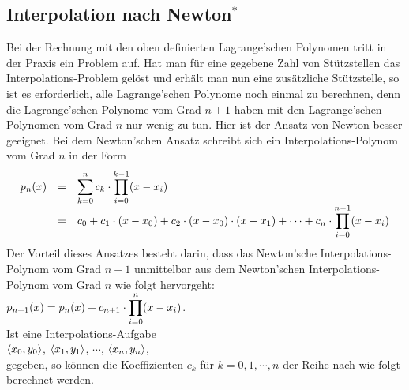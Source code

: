 \subsection{Interpolation nach Newton$^*$}
Bei der Rechnung mit den oben definierten Lagrange'schen Polynomen tritt in der Praxis ein
Problem auf.  Hat man f\"ur eine gegebene Zahl von St\"utzstellen das Interpolations-Problem
gel\"ost und erh\"alt man nun eine zus\"atzliche St\"utzstelle, so ist es erforderlich, alle
Lagrange'schen Polynome noch einmal zu berechnen, denn die Lagrange'schen Polynome vom
Grad $n+1$ haben mit den Lagrange'schen Polynomen vom Grad $n$ nur wenig zu tun.  Hier ist
der Ansatz von Newton besser geeignet.  Bei dem Newton'schen Ansatz schreibt sich ein
Interpolations-Polynom vom Grad $n$ in der Form 
\begin{equation}
  \label{eq:newtonInterpolation}  
\begin{array}[t]{lcl}
p_n(x) & = & \displaystyle\sum\limits_{k=0}^n c_k \cdot  \prod\limits_{i=0}^{k-1}(x-x_i) \\[0.3cm]
       & = & \displaystyle c_0 + c_1\cdot (x-x_0) + c_2 \cdot  (x-x_0)\cdot (x - x_1) + \cdots + c_n \cdot  \prod\limits_{i=0}^{n-1}(x-x_i) 
\end{array}
\end{equation}
Der Vorteil dieses Ansatzes besteht darin, dass das Newton'sche Interpolations-Polynom vom Grad $n+1$ unmittelbar aus
dem Newton'schen Interpolations-Polynom vom Grad $n$ wie folgt hervorgeht: 
\\[0.2cm]
\hspace*{1.3cm}
$\displaystyle p_{n+1}(x) = p_n(x) + c_{n+1} \cdot  \prod\limits_{i=0}^{n}(x-x_i)$.
\\[0.2cm]
Ist eine Interpolations-Aufgabe 
\\[0.2cm]
\hspace*{1.3cm}
$\pair(x_0,y_0)$, 
$\pair(x_1,y_1)$, 
$\cdots$, 
$\pair(x_n,y_n)$, 
\\[0.2cm]
gegeben, so k\"onnen die Koeffizienten $c_k$ f\"ur $k=0,1,\cdots,n$ der Reihe nach wie folgt
berechnet werden.
